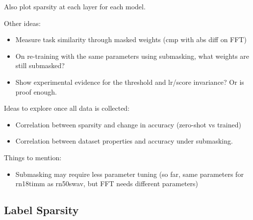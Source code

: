 \documentclass{article}
\begin{document}
    Also plot sparsity at each layer for each model.

    Other ideas:
    \begin{itemize}
        \item Measure task similarity through masked weights (cmp with abs diff on FFT)
        \item On re-training with the same parameters using submasking, what weights are still submasked?
        \item Show experimental evidence for the threshold and lr/score invariance? Or is proof enough.
    \end{itemize}

    Ideas to explore once all data is collected:
    \begin{itemize}
        \item Correlation between sparsity and change in accuracy (zero-shot vs trained)
        \item Correlation between dataset properties and accuracy under submasking.
    \end{itemize}


    Things to mention:
    \begin{itemize}
        \item Submasking may require less parameter tuning (so far, same parameters for rn18timm as rn50swav, but FFT needs different parameters)
    \end{itemize}

    \subsection{Label Sparsity}
\end{document}
